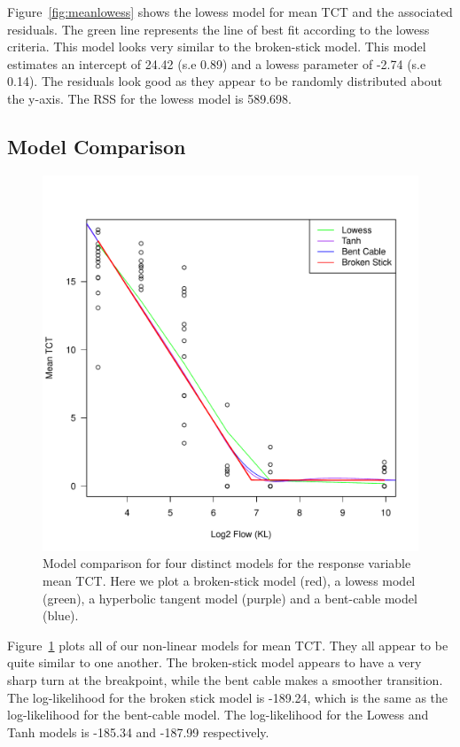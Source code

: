 Figure~\ref{fig:meanlowess} shows the lowess model for mean TCT and the associated residuals. The green line represents the line of best fit according to the lowess criteria. This model looks very similar to the broken-stick model. This model estimates an intercept of 24.42 (s.e 0.89) and a lowess parameter of -2.74 (s.e 0.14). The residuals look good as they appear to be randomly distributed about the y-axis. The RSS for the lowess model is 589.698.




\newpage

\subsection{Model Comparison}

\begin{figure}[H]
\includegraphics[scale=0.9]{Chapter4Images/meanTCTmodelcomparison.pdf}
\caption{\hspace{1mm}Model comparison for four distinct models for the response variable mean TCT. Here we plot a broken-stick model (red), a lowess model (green), a hyperbolic tangent model (purple) and a bent-cable model (blue).}
\label{fig:modelcomparison}
\end{figure}

Figure~\ref{fig:modelcomparison} plots all of our non-linear models for mean TCT. They all appear to be quite similar to one another. The broken-stick model appears to have a very sharp turn at the breakpoint, while the bent cable makes a smoother transition.  The log-likelihood for the broken stick model is -189.24, which is the same as the log-likelihood for the bent-cable model. The log-likelihood for the Lowess and Tanh models is -185.34 and -187.99 respectively.


